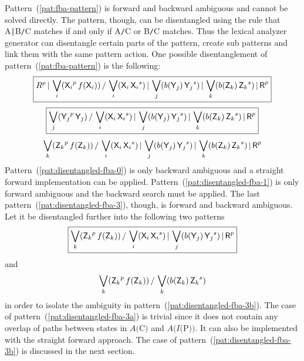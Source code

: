 \documentclass[acmtoplas]{acmtrans2m}
\newcommand{\patternref}[1]{pattern~(\ref{pat:#1})}
\newcommand{\Patternref}[1]{Pattern~(\ref{pat:#1})}
\newcommand{\fa}[1]{$A(${\sf #1}$)$}
\newcommand{\finv}[1]{$I(${\sf #1}$)$}
\newcommand{\pXi}{$\mbox{\sf X}_i$}
\newcommand{\pYj}{$\mbox{\sf Y}_j$}
\newcommand{\pZk}{$\mbox{\sf Z}_k$}
\newcommand{\corepattern}[1] {\mbox{\sf #1}^p  \,  \mbox{\sf #1}}
\newcommand{\corepatternf}[1]{\mbox{\sf #1}^p  \,f(\mbox{\sf #1})}
\newcommand{\postcontext}[1] {\mbox{\sf #1}    \,  \mbox{\sf #1}^s}
\newcommand{\postcontextb}[1]{b(\mbox{\sf #1}) \,  \mbox{\sf #1}^s}
\begin{document}
\Patternref{fba-pattern} is forward and
backward ambiguous and cannot be solved directly. The pattern, though,
can be disentangled using the rule that {\sf A{\tt |}B{\tt /}C} matches if and only 
if {\sf A{\tt /}C} or {\sf B{\tt /}C} matches. Thus
the lexical analyzer generator can disentangle certain parts of the pattern,
create sub patterns and link them with the same pattern action. One
possible disentanglement of \patternref{fba-pattern} is the
following:
\begin{equation}
    \label{pat:disentangled-fba-0}
    \fbox{$\displaystyle 
          R^p \,|\, \bigvee_i( \corepatternf{\pXi} )
     \, / \,       
                \bigvee_i( \postcontext{\pXi} )
          \,|\, \bigvee_j( \postcontextb{\pYj}  )
          \,|\, \bigvee_k( \postcontextb{\pZk} )
          \,|\, \mbox{\sf R}^p
    $}
\end{equation}
\begin{equation}
    \label{pat:disentangled-fba-1}
\fbox{$\displaystyle 
                \bigvee_j( \corepattern{\pYj}  )
      \, / \,       
                \bigvee_i( \postcontext{\pXi} )
          \,|\, \bigvee_j( \postcontextb{\pYj}  )
          \,|\, \bigvee_k( \postcontextb{\pZk} )
          \,|\, \mbox{\sf R}^p
      $}
\end{equation}
\begin{equation}
    \label{pat:disentangled-fba-3}
                \bigvee_k( \corepatternf{\pZk} )
    \, / \,       
                \bigvee_i( \postcontext{\pXi} )
          \,|\, \bigvee_j( \postcontextb{\pYj}  )
          \,|\, \bigvee_k( \postcontextb{\pZk} )
          \,|\, \mbox{\sf R}^p
\end{equation}
\Patternref{disentangled-fba-0} is only backward ambiguous and a straight
forward implementation can be applied. \Patternref{disentangled-fba-1} is only
forward ambiguous and the backward search must be applied. The last 
\patternref{disentangled-fba-3}, though, is forward and backward ambiguous. Let it be
disentangled further into the following two patterns 
\begin{equation} \label{pat:disentangled-fba-3a}
    \fbox{$\displaystyle 
                \bigvee_k( \corepatternf{\pZk} )
   \, / \,       
                \bigvee_i( \postcontext{\pXi} )
          \,|\, \bigvee_j( \postcontextb{\pYj}  )
          \,|\, \mbox{\sf R}^p
    $}
\end{equation}
and
\begin{equation} \label{pat:disentangled-fba-3b}
          \bigvee_k( \corepatternf{\pZk} )
    \, / \,       
          \bigvee_k( \postcontextb{\pZk} )
\end{equation}
in order to isolate the ambiguity in \patternref{disentangled-fba-3b}.  The
case of \patternref{disentangled-fba-3a} is trivial since it does not contain
any overlap of paths between states in \fa{C} and \fa{\finv{P}}. It can also be
implemented with the straight forward approach. The case of
\patternref{disentangled-fba-3b} is discussed in the next section.
\end{document}
